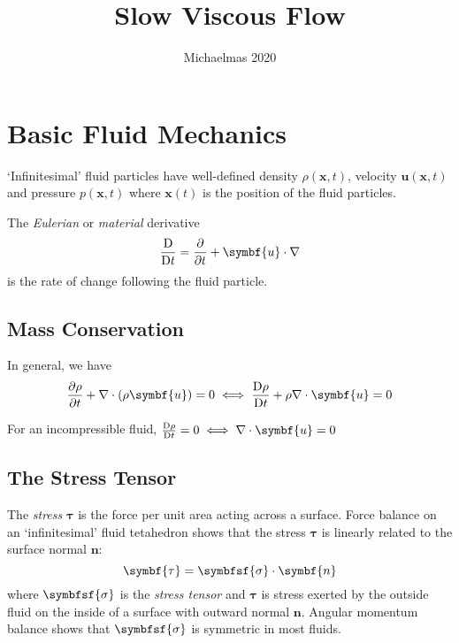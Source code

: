 \documentclass{jknotes}
\begin{document}
\title{Slow Viscous Flow}
\date{Michaelmas 2020}

\maketitle
\suggestionsspiel
\tableofcontents

\section{Basic Fluid Mechanics}
`Infinitesimal' fluid particles have well-defined density $\rho(\symbf{x},t)$,
velocity $\symbf{u}(\symbf{x},t)$ and pressure $p(\symbf{x},t)$ where $\symbf{x}(t)$ is
the position of the fluid particles.

\begin{defn}
	The \emph{Eulerian} or \emph{material} derivative
	\begin{equation}
		\frac{\diffD}{\diffD{t}} = \frac{\partial}{\partial t} + \symbf{u}\cdot
		\nabla
	\end{equation}
	is the rate of change following the fluid particle.
\end{defn}

\subsection{Mass Conservation}
In general, we have
\begin{equation}
\frac{\partial \rho}{\partial t} + \nabla \cdot \left(\rho \symbf{u}\right) = 0
\iff \frac{\diffD{\rho}}{\diffD{t}} + \rho \nabla \cdot \symbf{u} = 0
\end{equation}

For an incompressible fluid, $\frac{\diffD{\rho}}{\diffD{t}} = 0 \iff \nabla
\cdot \symbf{u} = 0$

\subsection{The Stress Tensor}
The \emph{stress} $\symbf{\tau}$ is the force per unit area acting across a
surface. Force balance on an `infinitesimal' fluid tetahedron shows that the
stress $\symbf{\tau}$ is linearly related to the surface normal $\symbf{n}$:
\begin{equation}
	\symbf{\tau} = \symbfsf{\sigma} \cdot \symbf{n}
\end{equation}
where $\symbfsf{\sigma}$ is the \emph{stress tensor} and $\symbf{\tau}$ is stress exerted
by the outside fluid on the inside of a surface with outward normal $\symbf{n}$.
Angular momentum balance shows that $\symbfsf{\sigma}$ is symmetric in most fluids.
\end{document}
